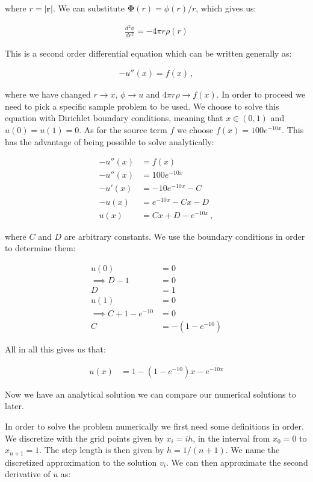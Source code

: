 \documentclass[english,notitlepage,reprint]{revtex4-1}  %
\begin{document}
where $r = |\boldsymbol r|$. We can substitute $\boldsymbol \Phi (r) = \phi(r)/r$, which gives us:

\begin{align*}
\frac{d^2 \phi}{dr^2} = - 4\pi r \rho (r)
\end{align*}

This is a second order differential equation which can be written generally as:

\begin{align*}
-u''(x) = f(x) \, , 
\end{align*}

where we have changed $r \to x$, $\phi \to u$ and $4\pi r \rho \to f(x)$. In order to proceed we need to pick a specific sample problem to be used. We choose to solve this equation with Dirichlet boundary conditions, meaning that $x \in (0,1)$ and $u(0)=u(1)=0$. As for the source term $f$ we choose $f(x) = 100 e^{-10 x}$. This has the advantage of being possible to solve analytically:

\begin{align*}
-u''(x) &= f(x) \\
-u''(x) &= 100 e^{-10x} \\
-u'(x) &= -10e^{-10x} - C \\
-u(x) &= e^{-10x} - Cx - D \\
u(x) &= Cx + D - e^{-10x} \, ,
\end{align*}

where $C$ and $D$ are arbitrary constants. We use the boundary conditions in order to determine them:

\begin{align*}
u(0) &= 0 \\
\implies D - 1 &= 0 \\
D &= 1 \\
u(1) &= 0 \\
\implies C + 1 - e^{-10} &= 0 \\
C &= -(1 - e^{-10})
\end{align*}

All in all this gives us that:

\begin{align*}
u(x) &= 1 - (1 - e^{-10}) x - e^{-10x}
\end{align*}

Now we have an analytical solution we can compare our numerical solutions to later. 

In order to solve the problem numerically we first need some definitions in order. We discretize with the grid points given by $x_i = ih$, in the interval from $x_0 = 0$ to $x_{n+1} = 1$. The step length is then given by $h = 1/(n+1)$. We name the discretized approximation to the solution $v_i$. We can then approximate the second derivative of $u$ as:
\end{document}

